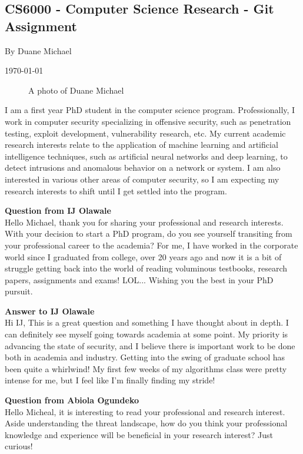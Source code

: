 \documentclass[11pt]{article}
\begin{document}
\begin{center}
    
    \section*{CS6000 - Computer Science Research - Git Assignment}
    By Duane Michael
    
    \today
\end{center}

\begin{figure}[h]
    \centering
    \caption{A photo of Duane Michael}
    \label{fig:headshot}
\end{figure}
I am a first year PhD student in the computer science program. Professionally, I work in computer security specializing in offensive security, such as penetration testing, exploit development, vulnerability research, etc. My current academic research interests relate to the application of machine learning and artificial intelligence techniques, such as artificial neural networks and deep learning, to detect intrusions and anomalous behavior on a network or system. I am also interested in various other areas of computer security, so I am expecting my research interests to shift until I get settled into the program.

\textbf{Question from IJ Olawale}\\
Hello Michael, thank you for sharing your professional and research interests. With your decision to start a PhD program, do you see yourself transiting from your professional career to the academia? For me, I have worked in the corporate world since I graduated from college, over 20 years ago and now it is a bit of struggle getting back into the world of reading voluminous testbooks, research papers, assignments and exams! LOL... Wishing you the best in your PhD pursuit.

\textbf{Answer to IJ Olawale}\\
Hi IJ, This is a great question and something I have thought about in depth. I can definitely see myself going towards academia at some point. My priority is advancing the state of security, and I believe there is important work to be done both in academia and industry. Getting into the swing of graduate school has been quite a whirlwind! My first few weeks of my algorithms class were pretty intense for me, but I feel like I'm finally finding my stride!

\textbf{Question from Abiola Ogundeko}\\
Hello Micheal, it is interesting to read your professional and research interest. Aside understanding the threat landscape, how do you think your professional knowledge and experience will be beneficial in your research interest? Just curious!
\end{document}
